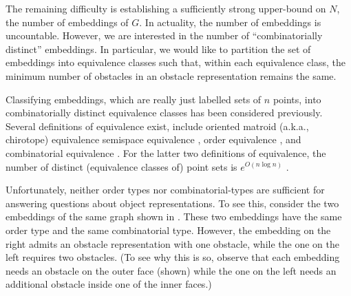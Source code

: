 \documentclass{patmorin}
\begin{document}
The remaining difficulty is establishing a sufficiently strong upper-bound
on $N$, the number of embeddings of $G$. In actuality, the number of
embeddings is uncountable.  However, we are interested in the number of
``combinatorially distinct'' embeddings.  In particular, we would like
to partition the set of embeddings into equivalence classes such that,
within each equivalence class, the minimum number of obstacles in an
obstacle representation remains the same.

Classifying embeddings, which are really just labelled sets of $n$ points,
into combinatorially distinct equivalence classes has been considered
previously. Several definitions of equivalence exist, include oriented
matroid (a.k.a., chirotope) equivalence \cite{2,3,5} semispace equivalence
\cite{8}, order equivalence \cite{7}, and combinatorial equivalence
\cite{6,8}.  For the latter two definitions of equivalence, the number
of distinct (equivalence classes of) point sets is $e^{O(n\log n)}$ \cite{DCG(1)}.


Unfortunately, neither order types nor combinatorial-types are
sufficient for answering questions about object representations.
To see this, consider the two embeddings of the same graph shown in
.  These two embeddings have the same order
type and the same combinatorial type. However, the embedding on the right
admits an obstacle representation with one obstacle, while the one on
the left requires two obstacles. (To see why this is so, observe that
each embedding needs an obstacle on the outer face (shown) while the one
on the left needs an additional obstacle inside one of the inner faces.)
\end{document}
